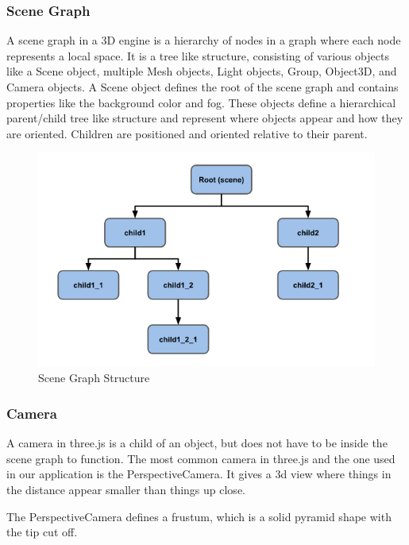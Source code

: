 \documentclass{article}
\begin{document}
    \subsubsection{Scene Graph}  A scene graph in a 3D engine is a hierarchy of nodes in a graph where each node represents a local space. It is a tree like structure, consisting of various objects like a Scene object, multiple Mesh objects, Light objects, Group, Object3D, and Camera objects.
    A Scene object defines the root of the scene graph and contains properties like the background color and fog. These objects define a hierarchical parent/child tree like structure and represent where objects appear and how they are oriented. Children are positioned and oriented relative to their parent. 
    \begin{figure}[h]
            \centering
            \includegraphics[width=15cm]{images/threeDotJS/sceneGraph.png}
            \caption{Scene Graph Structure}
        \end{figure}
        
    \subsubsection{Camera}
    A camera in three.js is a child of an object, but does not have to be inside the scene graph to function. The most common camera in three.js and the one used in our application is the PerspectiveCamera. It gives a 3d view where things in the distance appear smaller than things up close.

The PerspectiveCamera defines a frustum, which is a solid pyramid shape with the tip cut off.
\end{document}

